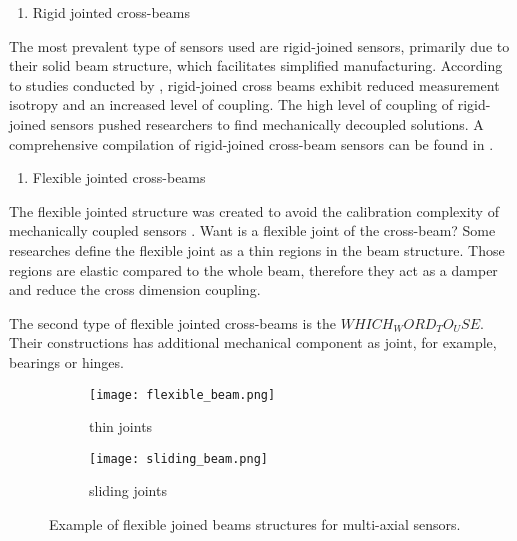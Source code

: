 
\begin{enumerate}
    \item Rigid jointed cross-beams
\end{enumerate}
The most prevalent type of sensors used are rigid-joined sensors, primarily due to their solid beam structure, 
which facilitates simplified manufacturing. 
According to studies conducted by \cite{multi_axis_force_sensors_review, beam_structure_math}, 
rigid-joined cross beams exhibit reduced measurement isotropy and an increased level of coupling. 
The high level of coupling of rigid-joined sensors pushed researchers to find mechanically decoupled solutions.
A comprehensive compilation of rigid-joined cross-beam sensors can be found in \cite{multi_axis_force_sensors_review}.

\begin{enumerate}[resume]
    \item Flexible jointed cross-beams
\end{enumerate}

The flexible jointed structure was created to avoid the calibration complexity of mechanically coupled sensors \cite{shape_optimization_decoupled}. 
Want is a flexible joint of the cross-beam? Some researches define the flexible joint as a thin regions in the beam structure. 
Those regions are elastic compared to the whole beam, therefore they act as a damper and reduce the cross dimension coupling. 

The second type of flexible jointed cross-beams is the $WHICH_WORD_TO_USE$. Their constructions has additional mechanical component as joint, for example, bearings or hinges.

\begin{figure}[H]
    \begin{subfigure}[b]{0.3\textwidth}
        \label{fig:flexible_beams_a}
        \texttt{[image: flexible\_beam.png]}
        \caption*{thin joints}
    \end{subfigure}
    \begin{subfigure}[b]{0.3\textwidth}
        \label{fig:flexible_beams_b}
        \texttt{[image: sliding\_beam.png]}
        \caption*{sliding joints}
    \end{subfigure}
    \caption{Example of flexible joined beams structures for multi-axial sensors.}
    \label{fig:flexible_beams}
\end{figure}


